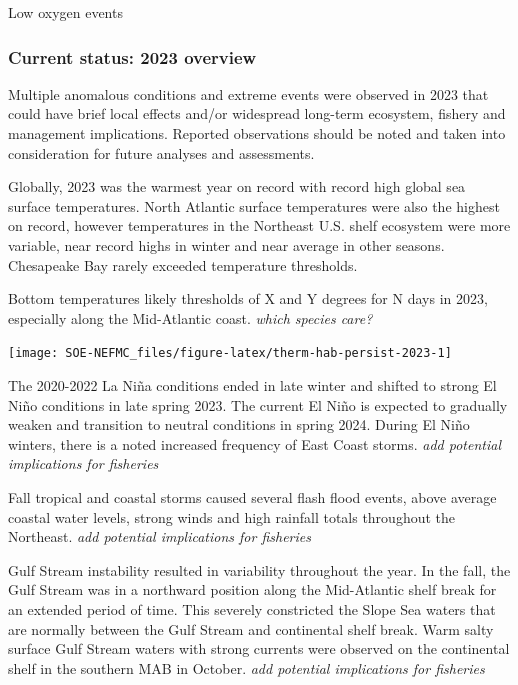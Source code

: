 \documentclass[
  10pt,
]{article}
\begin{document}
Low oxygen events

\hypertarget{current-status-2023-overview}{%
\subsubsection{Current status: 2023 overview}\label{current-status-2023-overview}}

Multiple anomalous conditions and extreme events were observed in 2023 that could have brief local effects and/or widespread long-term ecosystem, fishery and management implications. Reported observations should be noted and taken into consideration for future analyses and assessments.

Globally, 2023 was the warmest year on record with record high global sea surface temperatures. North Atlantic surface temperatures were also the highest on record, however temperatures in the Northeast U.S. shelf ecosystem were more variable, near record highs in winter and near average in other seasons. Chesapeake Bay rarely exceeded temperature thresholds.

Bottom temperatures likely thresholds of X and Y degrees for N days in 2023, especially along the Mid-Atlantic coast. \emph{which species care?}

\begin{center}\texttt{[image: SOE-NEFMC\_files/figure-latex/therm-hab-persist-2023-1]} \end{center}

The 2020-2022 La Niña conditions ended in late winter and shifted to strong El Niño conditions in late spring 2023. The current El Niño is expected to gradually weaken and transition to neutral conditions in spring 2024. During El Niño winters, there is a noted increased frequency of East Coast storms. \emph{add potential implications for fisheries}

Fall tropical and coastal storms caused several flash flood events, above average coastal water levels, strong winds and high rainfall totals throughout the Northeast. \emph{add potential implications for fisheries}

Gulf Stream instability resulted in variability throughout the year. In the fall, the Gulf Stream was in a northward position along the Mid-Atlantic shelf break for an extended period of time. This severely constricted the Slope Sea waters that are normally between the Gulf Stream and continental shelf break. Warm salty surface Gulf Stream waters with strong currents were observed on the continental shelf in the southern MAB in October. \emph{add potential implications for fisheries}
\end{document}
